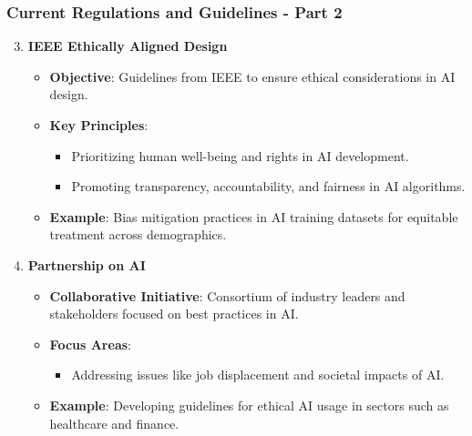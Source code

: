 \documentclass{beamer}
\begin{document}
\begin{frame}[fragile]
    \frametitle{Current Regulations and Guidelines - Part 2}
    \begin{enumerate}
        \setcounter{enumi}{2} %
        \item \textbf{IEEE Ethically Aligned Design}
            \begin{itemize}
                \item \textbf{Objective}: Guidelines from IEEE to ensure ethical considerations in AI design.
                \item \textbf{Key Principles}:
                    \begin{itemize}
                        \item Prioritizing human well-being and rights in AI development.
                        \item Promoting transparency, accountability, and fairness in AI algorithms.
                    \end{itemize}
                \item \textbf{Example}: Bias mitigation practices in AI training datasets for equitable treatment across demographics.
            \end{itemize}
        
        \item \textbf{Partnership on AI}
            \begin{itemize}
                \item \textbf{Collaborative Initiative}: Consortium of industry leaders and stakeholders focused on best practices in AI.
                \item \textbf{Focus Areas}:
                    \begin{itemize}
                        \item Addressing issues like job displacement and societal impacts of AI.
                    \end{itemize}
                \item \textbf{Example}: Developing guidelines for ethical AI usage in sectors such as healthcare and finance.
            \end{itemize}
    \end{enumerate}
\end{frame}
\end{document}
